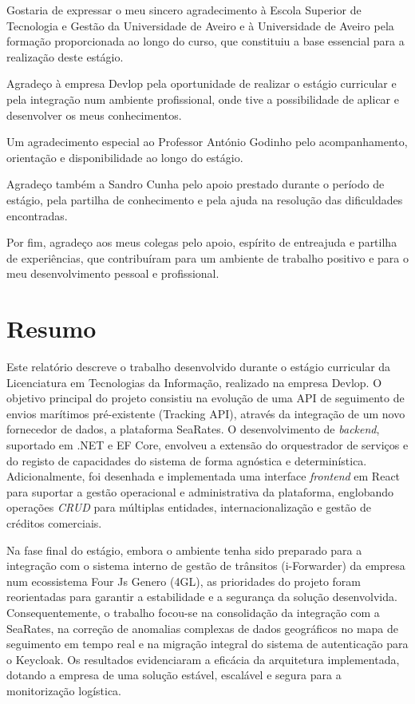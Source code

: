 \documentclass[a4paper,12pt]{report}
\begin{document}
Gostaria de expressar o meu sincero agradecimento à Escola Superior de Tecnologia e Gestão da Universidade de Aveiro e à Universidade de Aveiro pela formação proporcionada ao longo do curso, que constituiu a base essencial para a realização deste estágio.

Agradeço à empresa Devlop pela oportunidade de realizar o estágio curricular e pela integração num ambiente profissional, onde tive a possibilidade de aplicar e desenvolver os meus conhecimentos.

Um agradecimento especial ao Professor António Godinho pelo acompanhamento, orientação e disponibilidade ao longo do estágio.

Agradeço também a Sandro Cunha pelo apoio prestado durante o período de estágio, pela partilha de conhecimento e pela ajuda na resolução das dificuldades encontradas.

Por fim, agradeço aos meus colegas pelo apoio, espírito de entreajuda e partilha de experiências, que contribuíram para um ambiente de trabalho positivo e para o meu desenvolvimento pessoal e profissional.

\newpage

\chapter*{Resumo}

Este relatório descreve o trabalho desenvolvido durante o estágio curricular da Licenciatura em Tecnologias da Informação, realizado na empresa Devlop. O objetivo principal do projeto consistiu na evolução de uma API de seguimento de envios marítimos pré-existente (Tracking API), através da integração de um novo fornecedor de dados, a plataforma SeaRates. O desenvolvimento de \textit{backend}, suportado em .NET e EF Core, envolveu a extensão do orquestrador de serviços e do registo de capacidades do sistema de forma agnóstica e determinística. Adicionalmente, foi desenhada e implementada uma interface \textit{frontend} em React para suportar a gestão operacional e administrativa da plataforma, englobando operações \textit{CRUD} para múltiplas entidades, internacionalização e gestão de créditos comerciais.

Na fase final do estágio, embora o ambiente tenha sido preparado para a integração com o sistema interno de gestão de trânsitos (i-Forwarder) da empresa num ecossistema Four Js Genero (4GL), as prioridades do projeto foram reorientadas para garantir a estabilidade e a segurança da solução desenvolvida. Consequentemente, o trabalho focou-se na consolidação da integração com a SeaRates, na correção de anomalias complexas de dados geográficos no mapa de seguimento em tempo real e na migração integral do sistema de autenticação para o Keycloak. Os resultados evidenciaram a eficácia da arquitetura implementada, dotando a empresa de uma solução estável, escalável e segura para a monitorização logística.
\end{document}
